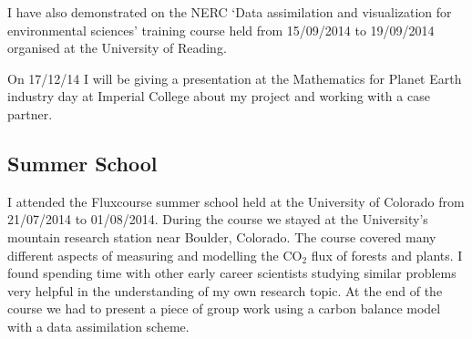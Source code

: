 \documentclass[11pt]{article}
\begin{document}
I have also demonstrated on the NERC `Data assimilation and visualization for environmental sciences' training course held from 15/09/2014 to 19/09/2014 organised at the University of Reading.

On 17/12/14 I will be giving a presentation at the Mathematics for Planet Earth industry day at Imperial College about my project and working with a case partner.

\subsection{Summer School}
I attended the Fluxcourse summer school held at the University of Colorado from 21/07/2014 to 01/08/2014. During the course we stayed at the University's mountain research station near Boulder, Colorado. The course covered many different aspects of measuring and modelling the CO$_2$ flux of forests and plants. I found spending time with other early career scientists studying similar problems very helpful in the understanding of my own research topic. At the end of the course we had to present a piece of group work using a carbon balance model with a data assimilation scheme.


{}

\end{document}
